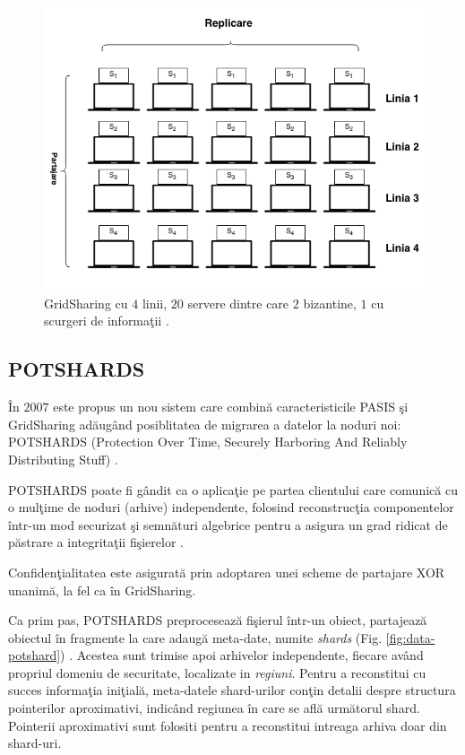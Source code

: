 \documentclass{llncs}
\begin{document}
\begin{figure}[H]
	\includegraphics[width=12cm]{img/GridSharing.png}    %
	\caption{GridSharing cu $4$ linii, $20$ servere dintre care $2$ bizantine, $1$ cu scurgeri de informa\c{t}ii \cite{SB:2005}.}
	\label{fig:grid_sharing}
	\bigskip
\end{figure}


\subsection{POTSHARDS} 
\label{sec:desc_potshards}
\^{I}n $2007$ este propus un nou sistem care combin\u{a} caracteristicile PASIS \c{s}i GridSharing ad\u{a}ug\^{a}nd posiblitatea de migrarea a datelor la noduri noi: POTSHARDS (Protection Over Time, Securely Harboring And Reliably Distributing Stuff) \cite{SGMV:2009}.

POTSHARDS poate fi g\^{a}ndit ca o aplica\c{t}ie pe partea clientului care comunic\u{a} cu o mul\c{t}ime de noduri (arhive) independente, folosind reconstruc\c{t}ia componentelor \^{i}ntr-un mod securizat \c{s}i semn\u{a}turi algebrice pentru a asigura un grad ridicat de p\u{a}strare a integrita\c{t}ii fi\c{s}ierelor \cite{STM:2006}.

Confiden\c{t}ialitatea este asigurat\u{a} prin adoptarea unei scheme de partajare XOR unanim\u{a}, la fel ca \^{i}n GridSharing.

Ca prim pas, POTSHARDS preproceseaz\u{a} fi\c{s}ierul \^{i}ntr-un obiect, partajeaz\u{a} obiectul \^{i}n fragmente la care adaug\u{a} meta-date, numite \textit{shards} (Fig. \ref{fig:data-potshard}) \cite{SGMV:2009}. Acestea sunt trimise apoi arhivelor independente, fiecare av\^{a}nd propriul domeniu de securitate, localizate in \textit{regiuni}. Pentru a reconstitui cu succes informa\c{t}ia ini\c{t}ial\u{a}, meta-datele shard-urilor con\c{t}in detalii despre structura pointerilor aproximativi, indic\^{a}nd regiunea \^{i}n care se afl\u{a} urm\u{a}torul shard. Pointerii aproximativi sunt folositi pentru a reconstitui intreaga arhiva doar din shard-uri.
\end{document}

